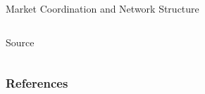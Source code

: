 \documentclass[aspectratio=1610]{beamer}
\begin{document}
\begin{frame}{Market Coordination and Network Structure}
\begin{columns}[c]
\begin{column}{0.5\textwidth}
			\footnotesize Source~\cite[][page 852]{baker_faulkner_1993}

		\end{column}
	\end{columns}
\end{frame}

\begin{frame}
	\frametitle{References}
	\printbibliography
 \end{frame} 

\end{document}
